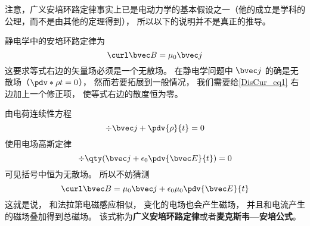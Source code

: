 注意，广义安培环路定律事实上已是电动力学的基本假设之一（他的成立是学科的公理，而不是由其他的定理得到）， 所以以下的说明并不是真正的推导。

静电学中的安培环路定律为
\begin{equation}\label{DisCur_eq1}
\curl\bvec B = \mu_0\bvec j
\end{equation}
这要求等式右边的矢量场必须是一个无散场。 在静电学问题中 $\bvec j$ 的确是无散场（$\pdv*{\rho}{t} = 0$）， 然而若要拓展到一般情况， 我们需要给\autoref{DisCur_eq1} 右边加上一个修正项， 使等式右边的散度恒为零。

由电荷连续性方程
\begin{equation}
\div \bvec j + \pdv{\rho}{t} = 0
\end{equation}
使用电场高斯定律
\begin{equation}
\div \qty(\bvec j + \epsilon_0\pdv{\bvec E}{t}) = 0
\end{equation}
可见括号中恒为无散场。 所以不妨猜测
\begin{equation}
\curl\bvec B = \mu_0\bvec j + \epsilon_0\mu_0\pdv{\bvec E}{t}
\end{equation}
这就是说， 和法拉第电磁感应相似， 变化的电场也会产生磁场， 并且和电流产生的磁场叠加得到总磁场。 该式称为\textbf{广义安培环路定律}或者\textbf{麦克斯韦—安培公式}。
